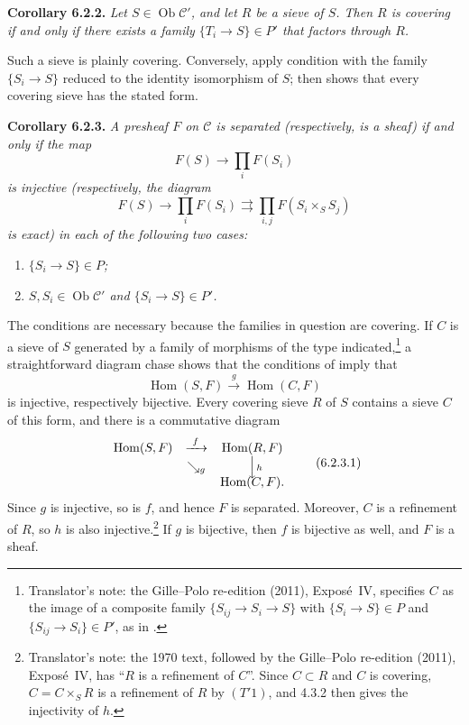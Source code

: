\medskip
\noindent{}\textbf{Corollary 6.2.2.}
\textit{Let \(S\in\operatorname{Ob}\mathscr C'\), and let \(R\) be a
sieve of \(S\). Then \(R\) is covering if and only if there exists a family
\(\{T_i\to S\}\in P'\) that factors through \(R\).}

Such a sieve is plainly covering. Conversely, apply condition  with the
family \(\{S_i\to S\}\) reduced to the identity isomorphism of \(S\);  then shows that every covering sieve has the stated form.

\medskip
\noindent{}\textbf{Corollary 6.2.3.}
\textit{A presheaf \(F\) on \(\mathscr C\) is separated (respectively, is
a sheaf) if and only if the map}
\[
  F(S)\longrightarrow\prod_iF(S_i)
\]
\textit{is injective (respectively, the diagram}
\[
  F(S)\longrightarrow\prod_iF(S_i)
  \rightrightarrows\prod_{i,j}F(S_i\times_SS_j)
\]
\textit{is exact) in each of the following two cases:}
\begin{enumerate}
  \item[(i)] \textit{\(\{S_i\to S\}\in P\);}
  \item[(ii)] \textit{\(S,S_i\in\operatorname{Ob}\mathscr C'\) and
    \(\{S_i\to S\}\in P'\).}
\end{enumerate}

The conditions are necessary because the families in question are
covering. If \(C\) is a sieve of \(S\) generated by a family of morphisms
of the type indicated,\footnote{Translator's note: the Gille--Polo re-edition (2011), Expos\'e~IV, specifies
\(C\) as the image of a composite family \(\{S_{ij}\to S_i\to S\}\) with
\(\{S_i\to S\}\in P\) and \(\{S_{ij}\to S_i\}\in P'\), as in
.} a straightforward diagram chase shows that the conditions of  imply that
\[
  \operatorname{Hom}(S,F)
  \xrightarrow{\ g\ }\operatorname{Hom}(C,F)
\]
is injective, respectively bijective. Every covering sieve \(R\) of \(S\)
contains a sieve \(C\) of this form, and there is a commutative diagram
\[
\begin{array}{ccccc}
  \operatorname{Hom}(S,F) & \xrightarrow{\ f\ } &
    \operatorname{Hom}(R,F)\\
  & \searrow_{\scriptstyle g} & \Big\downarrow\rlap{\(\scriptstyle h\)}\\[-0.25em]
  & & \operatorname{Hom}(C,F).
\end{array}
\tag{6.2.3.1}\label{sga3:iv:corollary:6:2:3:eq:6:2:3:1:01}
\]
Since \(g\) is injective, so is \(f\), and hence \(F\) is separated.
Moreover, \(C\) is a refinement of \(R\), so \(h\) is also injective.\footnote{Translator's note: the 1970 text, followed by the
Gille--Polo re-edition (2011), Expos\'e~IV, has ``\(R\) is a refinement of
\(C\)''. Since \(C\subset R\) and \(C\) is covering, \(C=C\times_SR\) is a
refinement of \(R\) by \((T'1)\), and 4.3.2 then gives the injectivity of
\(h\).} If \(g\) is
bijective, then \(f\) is bijective as well, and \(F\) is a sheaf.

